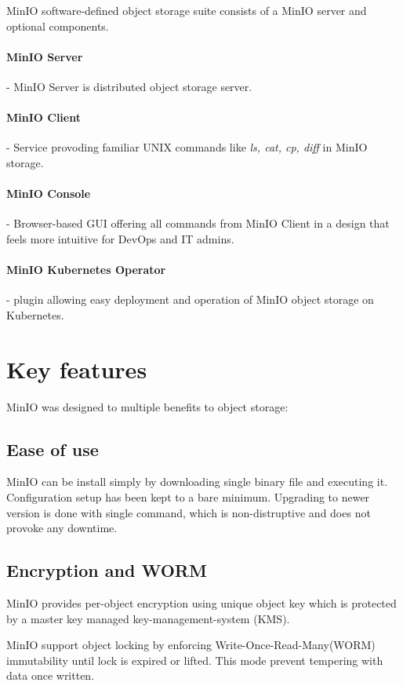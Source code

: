     MinIO software-defined object storage suite consists of a MinIO server and optional components.

    \paragraph{MinIO Server} - MinIO Server is distributed object storage server.
    \paragraph{MinIO Client} - Service provoding familiar UNIX commands like \textit{ls, cat, cp, diff} in MinIO storage.
    \paragraph{MinIO Console} - Browser-based GUI offering all commands from MinIO Client in a design that feels more intuitive for DevOps and IT admins.
    \paragraph{MinIO Kubernetes Operator} - plugin allowing easy deployment and operation of MinIO object storage on Kubernetes.

\section{Key features}
    MinIO was designed to multiple benefits to object storage:

    \subsection*{Ease of use}
    MinIO can be install simply by downloading single binary file and executing it. Configuration setup has been kept to a bare minimum. Upgrading to newer version is done with single command, which is non-distruptive and does not provoke any downtime\cite{minioIntel}.

    \subsection*{Encryption and WORM}
    MinIO provides per-object encryption using unique object key which is protected by a master key managed key-management-system (KMS).

    MinIO support object locking by enforcing Write-Once-Read-Many(WORM) immutability until lock is expired or lifted. This mode prevent tempering with data once written\cite{minioHighPerformance}.


